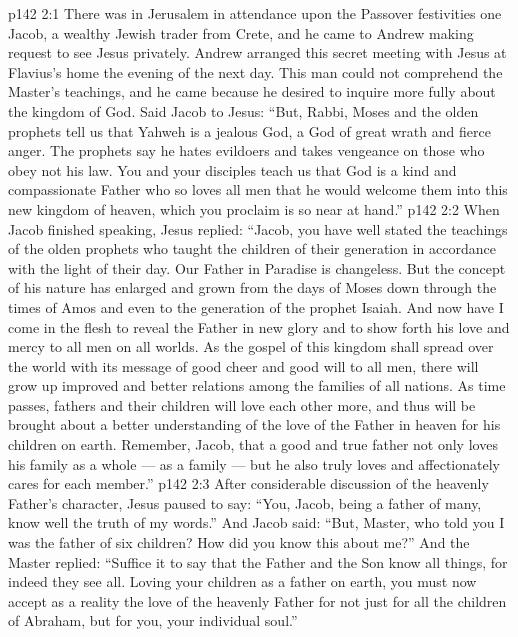 \vs p142 2:1 There was in Jerusalem in attendance upon the Passover festivities one Jacob, a wealthy Jewish trader from Crete, and he came to Andrew making request to see Jesus privately. Andrew arranged this secret meeting with Jesus at Flavius’s home the evening of the next day. This man could not comprehend the Master’s teachings, and he came because he desired to inquire more fully about the kingdom of God. Said Jacob to Jesus: “But, Rabbi, Moses and the olden prophets tell us that Yahweh is a jealous God, a God of great wrath and fierce anger. The prophets say he hates evildoers and takes vengeance on those who obey not his law. You and your disciples teach us that God is a kind and compassionate Father who so loves all men that he would welcome them into this new kingdom of heaven, which you proclaim is so near at hand.”
\vs p142 2:2 \pc When Jacob finished speaking, Jesus replied: \textcolor{ubdarkred}{“Jacob, you have well stated the teachings of the olden prophets who taught the children of their generation in accordance with the light of their day. Our Father in Paradise is changeless. But the concept of his nature has enlarged and grown from the days of Moses down through the times of Amos and even to the generation of the prophet Isaiah. And now have I come in the flesh to reveal the Father in new glory and to show forth his love and mercy to all men on all worlds. As the gospel of this kingdom shall spread over the world with its message of good cheer and good will to all men, there will grow up improved and better relations among the families of all nations. As time passes, fathers and their children will love each other more, and thus will be brought about a better understanding of the love of the Father in heaven for his children on earth. Remember, Jacob, that a good and true father not only loves his family as a whole --- as a family --- but he also truly loves and affectionately cares for each  member.”}
\vs p142 2:3 After considerable discussion of the heavenly Father’s character, Jesus paused to say: \textcolor{ubdarkred}{“You, Jacob, being a father of many, know well the truth of my words.”} And Jacob said: “But, Master, who told you I was the father of six children? How did you know this about me?” And the Master replied: \textcolor{ubdarkred}{“Suffice it to say that the Father and the Son know all things, for indeed they see all. Loving your children as a father on earth, you must now accept as a reality the love of the heavenly Father for  not just for all the children of Abraham, but for you, your individual soul.”}
